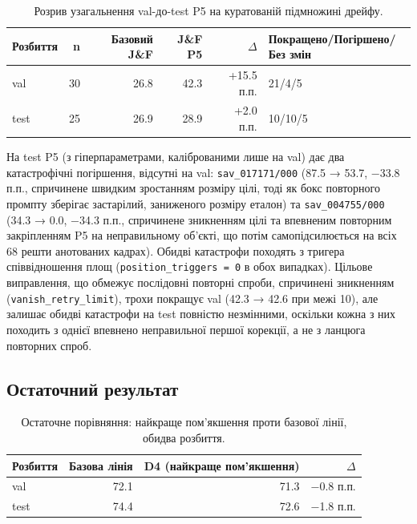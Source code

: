 \documentclass[11pt]{article}
\begin{document}
\begin{table}[!htbp]
\centering
\caption{Розрив узагальнення val-до-test P5 на куратованій підмножині дрейфу.}
\label{tab:10}
\small
\begin{tabularx}{\textwidth}{@{}lrrrrL@{}}
\toprule
Розбиття & n & Базовий J\&F & J\&F P5 & $\Delta$ & Покращено/Погіршено/Без змін \\
\midrule
val & 30 & 26.8 & 42.3 & +15.5 п.п. & 21/4/5 \\
test & 25 & 26.9 & 28.9 & +2.0 п.п. & 10/10/5 \\
\bottomrule
\end{tabularx}
\end{table}

На test P5 (з гіперпараметрами, каліброваними лише на val) дає два катастрофічні погіршення, відсутні на val: \texttt{sav\_017171/000} (87.5 → 53.7, −33.8 п.п., спричинене швидким зростанням розміру цілі, тоді як бокс повторного промпту зберігає застарілий, заниженого розміру еталон) та \texttt{sav\_004755/000} (34.3 → 0.0, −34.3 п.п., спричинене зникненням цілі та впевненим повторним закріпленням P5 на неправильному об'єкті, що потім самопідсилюється на всіх 68 решти анотованих кадрах). Обидві катастрофи походять з тригера співвідношення площ (\texttt{position\_triggers = 0} в обох випадках). Цільове виправлення, що обмежує послідовні повторні спроби, спричинені зникненням (\texttt{vanish\_retry\_limit}), трохи покращує val (42.3 → 42.6 при межі 10), але залишає обидві катастрофи на test повністю незмінними, оскільки кожна з них походить з однієї впевнено неправильної першої корекції, а не з ланцюга повторних спроб.

\subsection{Остаточний результат}

\begin{table}[!htbp]
\centering
\caption{Остаточне порівняння: найкраще пом'якшення проти базової лінії, обидва розбиття.}
\label{tab:11}
\begin{tabular}{@{}lrrr@{}}
\toprule
Розбиття & Базова лінія & D4 (найкраще пом'якшення) & $\Delta$ \\
\midrule
val & 72.1 & 71.3 & −0.8 п.п. \\
test & 74.4 & 72.6 & −1.8 п.п. \\
\bottomrule
\end{tabular}
\end{table}
\end{document}
